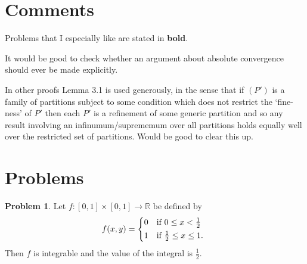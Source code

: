 \documentclass[20pt]{article}
\theoremstyle{plain}
\theoremstyle{definition}
\newtheorem*{problem}{Problem}
\newcommand{\reals}{\mathbb{R}}
\begin{document}
\section{Comments}

Problems that I especially like are stated in \textbf{bold}.

It would be good to check whether an argument about absolute convergence should ever be made explicitly.

In other proofs Lemma 3.1 is used generously, in the sense that if $(P')$ 
is a family of partitions subject to some condition which does not restrict the
`fine-ness' of $P'$
then each $P'$ is a refinement of some generic partition and so any result 
involving an infinumum/suprememum over all partitions holds equally well over
the restricted set of partitions.  Would be good to clear this up.













































\break
\section{Problems}

\begin{problem}{3.1}
  Let $f: [0,1] \times [0, 1] \to \reals$ be defined by
 \begin{equation*}
    f(x, y) =
    \begin{cases*}
      0 & if $0 \leq x < \frac{1}{2}$ \\
      1 & if $ \frac{1}{2} \leq x \leq 1 $.
    \end{cases*}
  \end{equation*}
Then $f$ is integrable and the value of the integral is $\frac{1}{2}.$
\end{problem}
\end{document}
